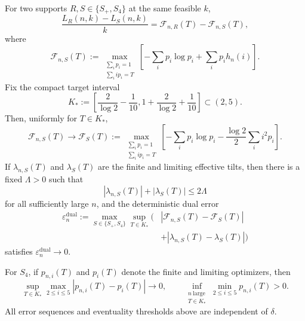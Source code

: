 \begin{lemma}
For two supports $R,S\in\{S_+,S_4\}$ at the same feasible $k$,
\begin{equation*}
  \frac{L_R(n,k)-L_S(n,k)}{k}
  =\mathcal F_{n,R}(T)-\mathcal F_{n,S}(T),
  \tag{3.8}
\end{equation*}
where
\begin{equation*}
  \mathcal F_{n,S}(T)
  :=
  \max_{\substack{\sum_i p_i=1\\\sum_i i p_i=T}}
  \left[
    -\sum_i p_i\log p_i+\sum_i p_i h_n(i)
  \right].
  \tag{3.8a}
\end{equation*}
Fix the compact target interval
\begin{equation*}
  K_*:=
  \left[
    \frac2{\log 2}-\frac1{10},
    1+\frac2{\log 2}+\frac1{10}
  \right]
  \subset(2,5).
  \tag{3.9a}
\end{equation*}
Then, uniformly for $T\in K_*$,
\begin{equation*}
  \mathcal F_{n,S}(T)
  \longrightarrow
  \mathcal F_S(T)
  :=
  \max_{\substack{\sum_i p_i=1\\\sum_i i p_i=T}}
  \left[
    -\sum_i p_i\log p_i
    -\frac{\log 2}{2}\sum_i i^2p_i
  \right].
  \tag{3.9}
\end{equation*}
If $\lambda_{n,S}(T)$ and $\lambda_S(T)$ are the finite and limiting
effective tilts, then there is a fixed $\Lambda>0$ such that
\[
  |\lambda_{n,S}(T)|+|\lambda_S(T)|\le2\Lambda
\]
for all sufficiently large $n$, and the deterministic dual error
\[
\begin{split}
  \varepsilon_n^{\mathrm{dual}}
  :=\max_{S\in\{S_+,S_4\}}
  \sup_{T\in K_*}
  \bigl(&|\mathcal F_{n,S}(T)-\mathcal F_S(T)|\\
        &+|\lambda_{n,S}(T)-\lambda_S(T)|\bigr)
\end{split}
\]
satisfies $\varepsilon_n^{\mathrm{dual}}\to0$.

For $S_4$, if $p_{n,i}(T)$ and $p_i(T)$ denote the finite and limiting
optimizers, then
\begin{equation*}
  \sup_{T\in K_*}\max_{2\le i\le5}
  |p_{n,i}(T)-p_i(T)|\longrightarrow0,
  \qquad
  \inf_{\substack{n\ \mathrm{large}\\T\in K_*}}
  \min_{2\le i\le5}p_{n,i}(T)>0.
  \tag{3.9b}
\end{equation*}
All error sequences and eventuality thresholds above are independent of
$\delta$.
\end{lemma}

